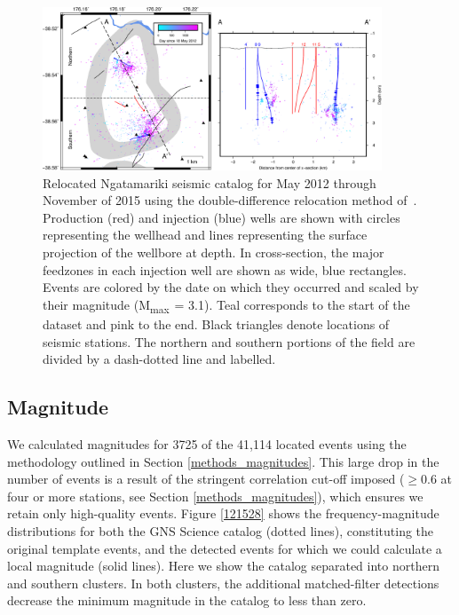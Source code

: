 \begin{figure}
\begin{center}
\includegraphics[width=0.9\textwidth,height=\textheight,keepaspectratio]{Chapter_3_Nga/figures/mrp_hypoDD_Nga_detections_hypoDD/mrp_DD_Nga_dets_GC_11-28-18}
\caption[Ngatamariki seismic catalog double-difference locations]{{
Relocated Ngatamariki seismic catalog for May 2012 through November of
2015 using the double-difference relocation method
of~\protect\citet{Trugman_2017}. Production (red) and injection (blue) wells are
shown with circles representing the wellhead and lines representing the
surface projection of the wellbore at depth. In cross-section, the major
\glspl{feedzone} in each injection well are shown as wide, blue rectangles.
Events are colored by the date on which they occurred and scaled by
their magnitude (M\textsubscript{max~}= 3.1). Teal corresponds to the
start of the dataset and pink to the end. Black triangles denote
locations of seismic stations. The northern and southern portions of the
field are divided by a dash-dotted line and labelled.
{\label{827409}}%
}}
\end{center}
\end{figure}

\subsection{Magnitude}
We calculated magnitudes for 3725 of the 41,114 located events using the methodology outlined in Section \ref{methods_magnitudes}. This large drop in the number of events is a result of the stringent correlation cut-off imposed ($\geq$0.6 at four or more stations, see Section \ref{methods_magnitudes}), which ensures we retain only high-quality events. Figure \ref{121528} shows the frequency-magnitude distributions for both the GNS Science catalog (dotted lines), constituting the original template events, and the detected events for which we could calculate a local magnitude (solid lines). Here we show the catalog separated into northern and southern clusters. In both clusters, the additional matched-filter detections decrease the minimum magnitude in the catalog to less than zero.


